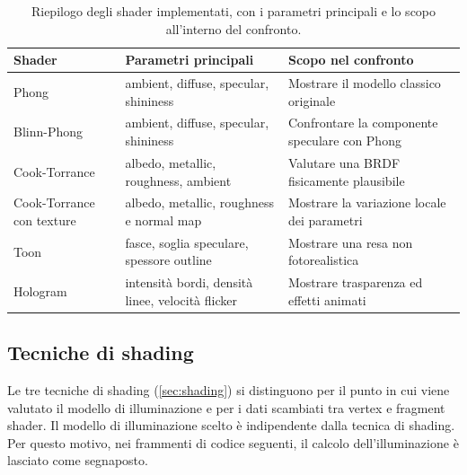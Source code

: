 \documentclass[12pt,a4paper,twoside]{book}
\begin{document}
\begin{table}[H]
    \centering
    \small
    \begin{tabular}{p{2.8cm} p{5cm} p{5cm}}
        \hline
        \textbf{Shader} & \textbf{Parametri principali} & \textbf{Scopo nel confronto}\\
        \hline
        Phong & ambient, diffuse, specular, shininess & Mostrare il modello classico originale \\
        \hline
        Blinn-Phong & ambient, diffuse, specular, shininess & Confrontare la componente speculare con Phong \\
        \hline
        Cook-Torrance & albedo, metallic, roughness, ambient & Valutare una BRDF fisicamente plausibile \\
        \hline
        Cook-Torrance con texture & albedo, metallic, roughness e normal map & Mostrare la variazione locale dei parametri \\
        \hline
        Toon & fasce, soglia speculare, spessore outline & Mostrare una resa non fotorealistica \\
        \hline
        Hologram & intensità bordi, densità linee, velocità flicker & Mostrare trasparenza ed effetti animati \\
        \hline
    \end{tabular}
    \caption[Riepilogo degli shader implementati]{Riepilogo degli shader implementati, con i parametri principali e lo scopo all'interno del confronto.}
    \label{tab:shader-riepilogo}
\end{table}

\subsection{Tecniche di shading}
\label{subsec:impl-shading-tecniche}

Le tre tecniche di shading (\cref{sec:shading}) si distinguono per il punto in cui viene valutato il modello di illuminazione e per i dati scambiati tra vertex e fragment shader. Il modello di illuminazione scelto è indipendente dalla tecnica di shading. Per questo motivo, nei frammenti di codice seguenti, il calcolo dell'illuminazione è lasciato come segnaposto.
\end{document}
